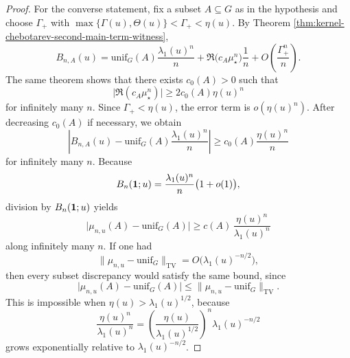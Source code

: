 \begin{proof}
For the converse statement, fix a subset \(A\subseteq G\) as in the hypothesis and choose \(\Gamma_+\) with \(\max\{\Gamma(u),\Theta(u)\}<\Gamma_+<\eta(u)\). By Theorem \ref{thm:kernel-chebotarev-second-main-term-witness},
\[
B_{n,A}(u)
=
\mathrm{unif}_G(A)\frac{\lambda_1(u)^n}{n}
+
\Re\!\bigl(c_A\mu_\star^n\bigr)\frac{1}{n}
+
O\!\left(\frac{\Gamma_+^n}{n}\right).
\]
The same theorem shows that there exists \(c_0(A)>0\) such that
\[
\bigl|\Re(c_A\mu_\star^n)\bigr|\ge 2c_0(A)\eta(u)^n
\]
for infinitely many \(n\). Since \(\Gamma_+<\eta(u)\), the error term is \(o(\eta(u)^n)\). After decreasing \(c_0(A)\) if necessary, we obtain
\[
\left|B_{n,A}(u)-\mathrm{unif}_G(A)\frac{\lambda_1(u)^n}{n}\right|
\ge
c_0(A)\frac{\eta(u)^n}{n}
\]
for infinitely many \(n\). Because
\[
B_n(\mathbf{1};u)=\frac{\lambda_1(u)^n}{n}\bigl(1+o(1)\bigr),
\]
division by \(B_n(\mathbf{1};u)\) yields
\[
\bigl|\mu_{n,u}(A)-\mathrm{unif}_G(A)\bigr|
\ge
c(A)\,\frac{\eta(u)^n}{\lambda_1(u)^n}
\]
along infinitely many \(n\). If one had
\[
\|\mu_{n,u}-\mathrm{unif}_G\|_{\mathrm{TV}}
=
O\!\bigl(\lambda_1(u)^{-n/2}\bigr),
\]
then every subset discrepancy would satisfy the same bound, since
\[
\bigl|\mu_{n,u}(A)-\mathrm{unif}_G(A)\bigr|
\le
\|\mu_{n,u}-\mathrm{unif}_G\|_{\mathrm{TV}}.
\]
This is impossible when \(\eta(u)>\lambda_1(u)^{1/2}\), because
\[
\frac{\eta(u)^n}{\lambda_1(u)^n}
=
\left(\frac{\eta(u)}{\lambda_1(u)^{1/2}}\right)^n\lambda_1(u)^{-n/2}
\]
grows exponentially relative to \(\lambda_1(u)^{-n/2}\).
\end{proof}

\endinput

